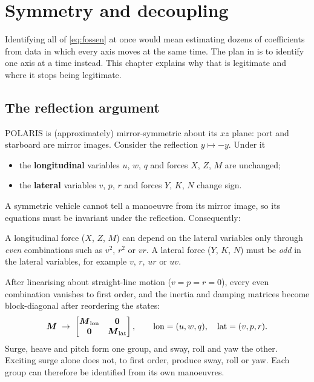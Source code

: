 \chapter{Symmetry and decoupling}
\label{ch:symmetry}

Identifying all of \eqref{eq:fossen} at once would mean estimating dozens of coefficients
from data in which every axis moves at the same time. The plan in  is to
identify one axis at a time instead. This chapter explains why that is legitimate and where
it stops being legitimate.

\section{The reflection argument}

POLARIS is (approximately) mirror-symmetric about its $xz$ plane: port and starboard are
mirror images. Consider the reflection $y \mapsto -y$. Under it
\begin{itemize}
  \item the \textbf{longitudinal} variables $u$, $w$, $q$ and forces $X$, $Z$, $M$ are unchanged;
  \item the \textbf{lateral} variables $v$, $p$, $r$ and forces $Y$, $K$, $N$ change sign.
\end{itemize}
A symmetric vehicle cannot tell a manoeuvre from its mirror image, so its equations must be
invariant under the reflection. Consequently:
\begin{keyidea}
A longitudinal force ($X$, $Z$, $M$) can depend on the lateral variables only through
\emph{even} combinations such as $v^2$, $r^2$ or $vr$. A lateral force ($Y$, $K$, $N$)
must be \emph{odd} in the lateral variables, for example $v$, $r$, $ur$ or $uv$.
\end{keyidea}
After linearising about straight-line motion ($v = p = r = 0$), every even combination
vanishes to first order, and the inertia and damping matrices become block-diagonal after
reordering the states:
\begin{equation}
  \boldsymbol{M} \;\to\; \begin{bmatrix} \boldsymbol{M}_\mathrm{lon} & \boldsymbol{0} \\ \boldsymbol{0} & \boldsymbol{M}_\mathrm{lat} \end{bmatrix},
  \qquad
  \text{lon} = (u, w, q), \quad \text{lat} = (v, p, r).
  \label{eq:blockdiag}
\end{equation}
Surge, heave and pitch form one group, and sway, roll and yaw the other. Exciting surge alone
does not, to first order, produce sway, roll or yaw. Each group can therefore be identified
from its own manoeuvres.

